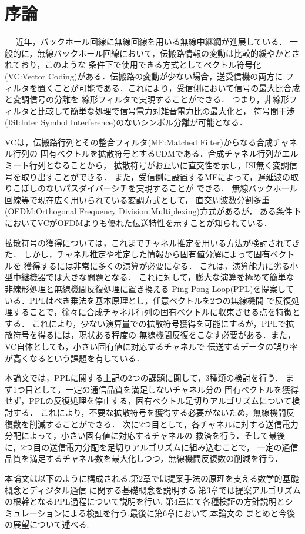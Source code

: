 \chapter{序論}
　
近年，バックホール回線に無線回線を用いる無線中継網が進展している．\cite{yamo} \cite{pabst}
一般的に，無線バックホール回線において，伝搬路情報の変動は比較的緩やかとされており，このような
条件下で使用できる方式としてベクトル符号化(VC:Vector Coding)がある．伝搬路の変動が少ない場合，送受信機の両方に
フィルタを置くことが可能である．これにより，受信側において信号の最大比合成と変調信号の分離を
線形フィルタで実現することができる．
つまり，非線形フィルタと比較して簡単な処理で信号電力対雑音電力比の最大化と，
符号間干渉(ISI:Inter Symbol Interference)のないシンボル分離が可能となる．

VCは，伝搬路行列とその整合フィルタ(MF:Matched Filter)からなる合成チャネル行列の
固有ベクトルを拡散符号とするCDMである．合成チャネル行列がエルミート行列となることから，
拡散符号がお互いに直交性を示し，ISI無く変調信号を取り出すことができる．
また，受信側に設置するMFによって，遅延波の取りこぼしのないパスダイバーシチを実現することが
できる．\cite{furukawa} 無線バックホール回線等で現在広く用いられている変調方式として，
直交周波数分割多重(OFDM:Orthogonal Frequency Division Multiplexing)方式があるが，
ある条件下においてVCがOFDMよりも優れた伝送特性を示すことが知られている．
\cite{kasturia}\cite{furukawa,li,takeda,takanashi}

拡散符号の獲得については，これまでチャネル推定を用いる方法が検討されてきた．\cite{nagate} 
\cite{imamura} しかし，チャネル推定や推定した情報から固有値分解によって固有ベクトルを
獲得するには非常に多くの演算が必要になる．\cite{takano} \cite{takeda2}
これは，演算能力に劣る小型中継機器では大きな問題となる．
これに対して，膨大な演算を極めて簡単な非線形処理と無線機間反復処理に置き換える
Ping-Pong-Loop(PPL)を提案している．PPLはべき乗法を基本原理とし，任意ベクトルを2つの無線機間
で反復処理することで，徐々に合成チャネル行列の固有ベクトルに収束させる点を特徴とする．
これにより，少ない演算量での拡散符号獲得を可能にするが，PPLで拡散符号を得るには，現状ある程度の
無線機間反復をこなす必要がある．また，VC自体としても，小さい固有値に対応するチャネルで
伝送するデータの誤り率が高くなるという課題を有している．

本論文では，PPLに関する上記の2つの課題に関して，3種類の検討を行う．
まず1つ目として，一定の通信品質を満足しないチャネル分の
固有ベクトルを獲得せず，PPLの反復処理を停止する，固有ベクトル足切りアルゴリズムについて検討する．
これにより，不要な拡散符号を獲得する必要がないため，無線機間反復数を削減することができる．
次に2つ目として，各チャネルに対する送信電力分配によって，小さい固有値に対応するチャネルの
救済を行う．そして最後に，2つ目の送信電力分配を足切りアルゴリズムに組み込むことで，
一定の通信品質を満足するチャネル数を最大化しつつ，無線機間反復数の削減を行う．

本論文は以下のように構成される.第2章では提案手法の原理を支える数学的基礎概念とディジタル通信
に関する基礎概念を説明する.第3章では提案アルゴリズムの根幹となるPPL過程について説明を行い,
第4章にて各種検証の方針説明とシミュレーションによる検証を行う.最後に第6章において,本論文の
まとめと今後の展望について述べる.